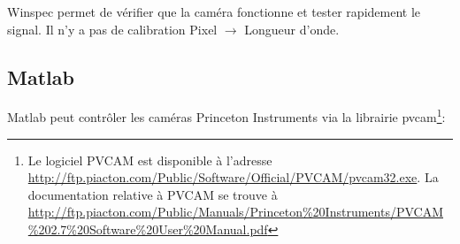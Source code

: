 \documentclass[11pt,francais]{book} %
\begin{document}
Winspec permet de vérifier que la caméra fonctionne et tester rapidement le signal.
Il n'y a pas de calibration Pixel $\rightarrow$ Longueur d'onde.

\subsection{Matlab}

Matlab peut contrôler les caméras Princeton Instruments via la librairie pvcam\footnote{Le logiciel PVCAM est disponible à l'adresse \url{http://ftp.piacton.com/Public/Software/Official/PVCAM/pvcam32.exe}. La documentation relative à PVCAM se trouve à \url{http://ftp.piacton.com/Public/Manuals/Princeton\%20Instruments/PVCAM\%202.7\%20Software\%20User\%20Manual.pdf}}:
\begin{center}
\end{center}

\end{document}
